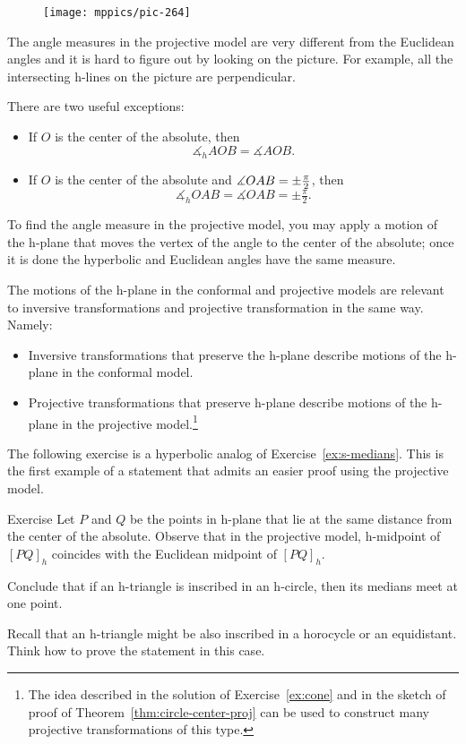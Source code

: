 {

\begin{wrapfigure}{r}{36mm}
\vskip-3mm
\centering
\texttt{[image: mppics/pic-264]}
\end{wrapfigure}

The angle measures in the projective model are very different from the Euclidean angles and it is hard to figure out by looking on the picture.\label{klein-angles}
For example, all the intersecting h-lines on the picture 
are perpendicular.

}

There are two useful exceptions:

\begin{itemize}
\item If $O$ is the center of the absolute, then 
$$\measuredangle_hAOB=\measuredangle AOB.$$
\item If $O$ is the center of the absolute 
and 
$\measuredangle OAB\z=\pm\tfrac\pi2$, then 
$$\measuredangle_h OAB=\measuredangle OAB=\pm\tfrac\pi2.$$
\end{itemize}

To find the angle measure in the projective model,
you may apply a motion of the h-plane that moves 
the vertex of the angle to the center of the absolute;
once it is done the hyperbolic and Euclidean angles have the same measure.

The motions of the h-plane in the conformal and projective models are relevant to inversive transformations and projective transformation in the same way.
Namely: 
\begin{itemize}
\item Inversive transformations that preserve the h-plane describe motions of the h-plane in the conformal model.
\item Projective transformations that preserve h-plane describe motions of the h-plane in the projective model.\footnote{The idea described in the solution of Exercise~\ref{ex:cone} and in the sketch of proof of Theorem~\ref{thm:circle-center-proj} can be used to construct many projective transformations of this type.}
\end{itemize}

The following exercise is a hyperbolic analog of Exercise~\ref{ex:s-medians}. 
This is the first example of a statement that admits an easier proof using  the projective model.

\begin{thm}{Exercise}\label{ex:h-median}
Let $P$ and $Q$ be the points in h-plane that lie at the same distance from the center of the absolute.
Observe that in the projective model, h-midpoint of $[PQ]_h$ coincides with the Euclidean midpoint of $[PQ]_h$.

Conclude that if an h-triangle is inscribed in an h-circle, then its medians meet at one point.

Recall that an h-triangle might be also inscribed in a horocycle or an equidistant.
Think how to prove the statement in this case.
\end{thm}

